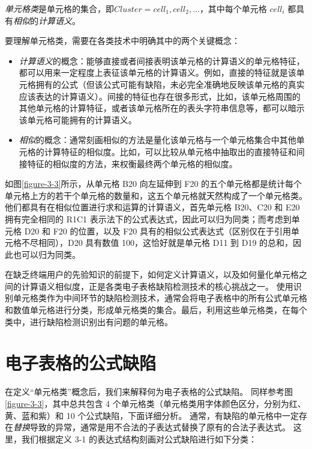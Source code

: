 \begin{definition}
    \textit{单元格类}是单元格的集合，即$Cluster = {cell_1, cell_2, \dots}$，其中每个单元格 $cell_i$ 都具有\textit{相似}的\textit{计算语义}。
\end{definition}

要理解单元格类，需要在各类技术中明确其中的两个关键概念：

\begin{itemize}
    \item \textit{计算语义}的概念：能够直接或者间接表明该单元格的计算语义的单元格特征，都可以用来一定程度上表征该单元格的计算语义。例如，直接的特征就是该单元格拥有的公式（但该公式可能有缺陷，未必完全准确地反映该单元格的真实应该表达的计算语义）。间接的特征也存在很多形式，比如，该单元格周围的其他单元格的计算特征，或者该单元格所在的表头字符串信息等，都可以暗示该单元格可能拥有的计算语义。
    \item \textit{相似}的概念：通常刻画相似的方法是量化该单元格与一个单元格集合中其他单元格的计算特征的相似度。比如，可以比较从单元格中抽取出的直接特征和间接特征的相似度的方法，来权衡最终两个单元格的相似度。
\end{itemize}

如图\ref{figure-3-3}所示，从单元格 B20 向左延伸到 F20 的五个单元格都是统计每个单元格上方的若干个单元格的数量和，这五个单元格就天然构成了一个单元格类。他们都具有在相似位置进行求和运算的计算语义，首先单元格 B20、C20 和 E20 拥有完全相同的 R1C1 表示法下的公式表达式，因此可以归为同类；而考虑到单元格 D20 和 F20 的位置，以及 F20 具有的相似公式表达式（区别仅在于引用单元格不尽相同），D20 具有数值 100，这恰好就是单元格 D11 到 D19 的总和，因此也可以归为同类。

在缺乏终端用户的先验知识的前提下，如何定义计算语义，以及如何量化单元格之间的计算语义相似度，正是各类电子表格缺陷检测技术的核心挑战之一\cite{Barowy2018excelint}。
使用识别单元格类作为中间环节的缺陷检测技术，通常会将电子表格中的所有公式单元格和数值单元格进行分类，形成单元格类的集合。最后，利用这些单元格类，在每个类中，进行缺陷检测识别出有问题的单元格。


\section{电子表格的公式缺陷}
在定义“单元格类”概念后，我们来解释何为电子表格的公式缺陷。
同样参考图\ref{figure-3-3}，其中总共包含 4 个单元格类（单元格类用字体颜色区分，分别为红、黄、蓝和紫）和 10 个公式缺陷，下面详细分析。
通常，有缺陷的单元格中一定存在\textit{替换}导致的异常，通常是用不合法的子表达式替换了原有的合法子表达式。
这里，我们根据定义 3-1 的表达式结构刻画对公式缺陷进行如下分类：

